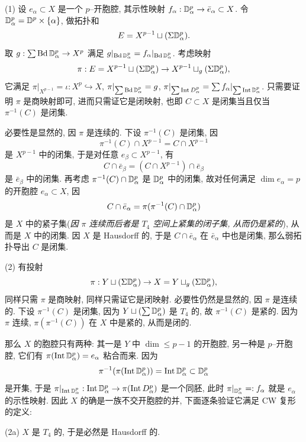 \begin{Proof}
	(1) 设 $ e_\alpha\subset X $ 是一个 $ p $--开胞腔, 其示性映射 $ f_\alpha : \mathbb{D}_\alpha^p\to\bar{e}_\alpha\subset X $. 令 $ \mathbb{D}_\alpha^p=\mathbb{D}^p\times\left\{ \alpha \right\} $, 做拓扑和
	\[
		E=X^{p-1}\sqcup(\Sigma\mathbb{D}_\alpha^p).
	\]
	取 $ g : \sum\mathrm{Bd}\,\mathbb{D}_\alpha^p\to X^p $ 满足 $ g|_{\mathrm{Bd}\,\mathbb{D}_\alpha^p}=f_\alpha|_{\mathrm{Bd}\,\mathbb{D}_\alpha^p} $. 考虑映射
	\[
		\pi : E=X^{p-1}\sqcup(\Sigma\mathbb{D}_\alpha^p)\to X^{p-1}\sqcup_g(\Sigma\mathbb{D}_\alpha^p),
	\]
	它满足 $ \pi|_{X^{p-1}}=\iota : X^p\hookrightarrow X $, $ \pi|_{\sum\mathrm{Bd}\,\mathbb{D}_\alpha^p}=g $, $ \pi|_{\sum\mathrm{Int}\,D_\alpha^p}=\sum f_\alpha |_{\sum\mathrm{Int}\,\mathbb{D}_\alpha^p} $. 只需要证明 $ \pi $ 是商映射即可, 进而只需证它是闭映射, 也即 $ C\subset X $ 是闭集当且仅当 $ \pi^{-1}(C) $ 是闭集.

	必要性是显然的, 因 $ \pi $ 是连续的. 下设 $ \pi^{-1}(C) $ 是闭集, 因
	\[
		\pi^{-1}(C)\cap X^{p-1}=C\cap X^{p-1}
	\]
	是 $ X^{p-1} $ 中的闭集, 于是对任意 $ e_\beta\subset X^{p-1} $, 有
	\[
		C\cap\bar{e}_\beta=(C\cap X^{p-1})\cap\bar{e}_\beta
	\]
	是 $ \bar{e}_\beta $ 中的闭集. 再考虑 $ \pi^{-1}(C)\cap\mathbb{D}_\alpha^p $ 是 $ \mathbb{D}_\alpha^p $ 中的闭集, 故对任何满足 $ \dim e_\alpha=p $ 的开胞腔 $ e_\alpha\subset X $, 因
	\[
		C\cap\bar{e}_\alpha=\pi(\pi^{-1}(C)\cap\mathbb{D}_\alpha^p)
	\]
	是 $ X $ 中的紧子集(\textit{因 $ \pi $ 连续而后者是 $ T_4 $ 空间上紧集的闭子集, 从而仍是紧的}), 从而是 $ X $ 中的闭集. 因 $ X $ 是 Hausdorff 的, 于是 $ C\cap\bar{e}_\alpha $ 在 $ \bar{e}_\alpha $ 中也是闭集, 那么弱拓扑导出 $ C $ 是闭集.

	(2) 有投射
	\[
		\pi : Y\sqcup(\Sigma\mathbb{D}_\alpha^p)\to X=Y\sqcup_g(\Sigma\mathbb{D}_\alpha^p),
	\]
	同样只需 $ \pi $ 是商映射, 同样只需证它是闭映射. 必要性仍然是显然的, 因 $ \pi $ 是连续的. 下设 $ \pi^{-1}(C) $ 是闭集, 因为 $ Y\sqcup(\sum\mathbb{D}_\alpha^p) $ 是 $ T_4 $ 的, 故 $ \pi^{-1}(C) $ 是紧的. 因为 $ \pi $ 连续, $ \pi(\pi^{-1}(C)) $ 在 $ X $ 中是紧的, 从而是闭的.
	
	那么 $ X $ 的胞腔只有两种: 其一是 $ Y $ 中 $ \dim\leqslant p-1 $ 的开胞腔, 另一种是 $ p $--开胞腔, 它们有 $ \pi(\mathrm{Int}\,\mathbb{D}_\alpha^p)=e_\alpha $ 粘合而来. 因为
	\[
		\pi^{-1}(\pi(\mathrm{Int}\,\mathbb{D}_\alpha^p))=\mathrm{Int}\,\mathbb{D}_\alpha^p\subset\mathbb{D}_\alpha^p
	\]
	是开集, 于是 $ \pi|_{\mathrm{Int}\,\mathbb{D}_\alpha^p} : \mathrm{Int}\,\mathbb{D}_\alpha^p\to\pi(\mathrm{Int}\,D_\alpha^p) $ 是一个同胚, 此时 $ \pi|_{\mathbb{D}_\alpha^p}=:f_\alpha $ 就是 $ e_\alpha $ 的示性映射. 因此 $ X $ 的确是一族不交开胞腔的并, 下面逐条验证它满足 CW 复形的定义:

	(2a) $ X $ 是 $ T_4 $ 的, 于是必然是 Hausdorff 的.


\end{Proof}

